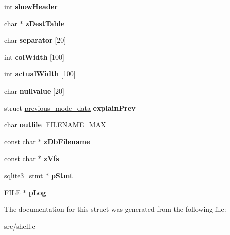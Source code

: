 \begin{DoxyCompactItemize}
\item 
\hypertarget{structcallback__data_a536becbd6527b94b07aa953dea4d5e23}{int {\bfseries show\-Header}}\label{structcallback__data_a536becbd6527b94b07aa953dea4d5e23}

\item 
\hypertarget{structcallback__data_af230a2bf2659515ab20cb8651521c7a3}{char $\ast$ {\bfseries z\-Dest\-Table}}\label{structcallback__data_af230a2bf2659515ab20cb8651521c7a3}

\item 
\hypertarget{structcallback__data_a86a0b78df0bcf34abebf2c3b002c4a4e}{char {\bfseries separator} \mbox{[}20\mbox{]}}\label{structcallback__data_a86a0b78df0bcf34abebf2c3b002c4a4e}

\item 
\hypertarget{structcallback__data_ab3a8931e699e39a443dfebb17f67db0f}{int {\bfseries col\-Width} \mbox{[}100\mbox{]}}\label{structcallback__data_ab3a8931e699e39a443dfebb17f67db0f}

\item 
\hypertarget{structcallback__data_a7d6ed83b0c8ea7524926669de9a13558}{int {\bfseries actual\-Width} \mbox{[}100\mbox{]}}\label{structcallback__data_a7d6ed83b0c8ea7524926669de9a13558}

\item 
\hypertarget{structcallback__data_adf5f480ac37d292d36223507efcf4e4b}{char {\bfseries nullvalue} \mbox{[}20\mbox{]}}\label{structcallback__data_adf5f480ac37d292d36223507efcf4e4b}

\item 
\hypertarget{structcallback__data_a2a9e29a6e29f1d2e2931d027e850a491}{struct \hyperlink{structprevious__mode__data}{previous\-\_\-mode\-\_\-data} {\bfseries explain\-Prev}}\label{structcallback__data_a2a9e29a6e29f1d2e2931d027e850a491}

\item 
\hypertarget{structcallback__data_aae6a31ddd572a5d68e2cfeb514ffd726}{char {\bfseries outfile} \mbox{[}F\-I\-L\-E\-N\-A\-M\-E\-\_\-\-M\-A\-X\mbox{]}}\label{structcallback__data_aae6a31ddd572a5d68e2cfeb514ffd726}

\item 
\hypertarget{structcallback__data_aa0634c06c7026cc0ed2e84995ed61a7c}{const char $\ast$ {\bfseries z\-Db\-Filename}}\label{structcallback__data_aa0634c06c7026cc0ed2e84995ed61a7c}

\item 
\hypertarget{structcallback__data_a06a1afdd74133b6ac5325a9e1f146b22}{const char $\ast$ {\bfseries z\-Vfs}}\label{structcallback__data_a06a1afdd74133b6ac5325a9e1f146b22}

\item 
\hypertarget{structcallback__data_a68cbfb5b75c7ef1d2edd7141ce59a8b1}{sqlite3\-\_\-stmt $\ast$ {\bfseries p\-Stmt}}\label{structcallback__data_a68cbfb5b75c7ef1d2edd7141ce59a8b1}

\item 
\hypertarget{structcallback__data_ab890ea205150f31f5d4bbd706f22ce39}{F\-I\-L\-E $\ast$ {\bfseries p\-Log}}\label{structcallback__data_ab890ea205150f31f5d4bbd706f22ce39}

\end{DoxyCompactItemize}


The documentation for this struct was generated from the following file\-:\begin{DoxyCompactItemize}
\item 
src/shell.\-c\end{DoxyCompactItemize}
